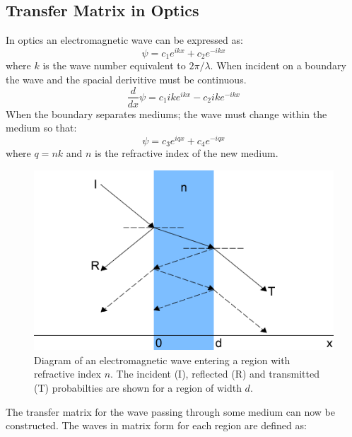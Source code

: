 \documentclass[12pt,a4paper]{article}
\begin{document}

	\subsection{Transfer Matrix in Optics}
	\label{optics}
		In optics an electromagnetic wave can be expressed as:
		\begin{equation}
			\psi=c_{1}e^{ikx}+c_{2}e^{-ikx}
		\end{equation}
		where $k$ is the wave number equivalent to $2\pi/\lambda$. When incident on a boundary the wave and the spacial derivitive must be continuous.
		\begin{equation}
			\frac{d}{dx}\psi=c_{1}ike^{ikx}-c_{2}ike^{-ikx}
		\end{equation}
		When the boundary separates mediums; the wave must change within the medium so that:
		\begin{equation}
			\psi=c_{3}e^{iqx}+c_{4}e^{-iqx}
		\end{equation}
		where $q=nk$ and $n$ is the refractive index of the new medium. 
		\begin{figure}[h]
			\centerline{\includegraphics[scale=0.5]{images/optics-barrier-flat}}
			\caption{Diagram of an electromagnetic wave entering a region with refractive index $n$. The incident (I), reflected (R) and transmitted (T) probabilties are shown for a region of width $d$.}
			\label{optics-barrier-flat}
		\end{figure}
		The transfer matrix for the wave passing through some medium can now be constructed. The waves in matrix form for each region are defined as:
\end{document}
